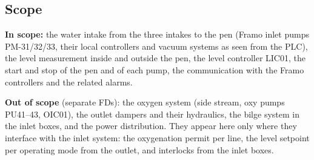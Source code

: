 \documentclass[11pt,a4paper]{article}
\begin{document}
\subsection{Scope}
\textbf{In scope:} the water intake from the three intakes to the pen (Framo inlet pumps PM-31/32/33,
their local controllers and vacuum systems as seen from the PLC), the level measurement inside and
outside the pen, the level controller LIC01, the start and stop of the pen and of each pump, the
communication with the Framo controllers and the related alarms.

\textbf{Out of scope} (separate FDs): the oxygen system (side stream, oxy pumps PU41--43, OIC01), the
outlet dampers and their hydraulics, the bilge system in the inlet boxes, and the power distribution.
They appear here only where they interface with the inlet system: the oxygenation permit per line,
the level setpoint per operating mode from the outlet, and interlocks from the inlet boxes.
\end{document}

